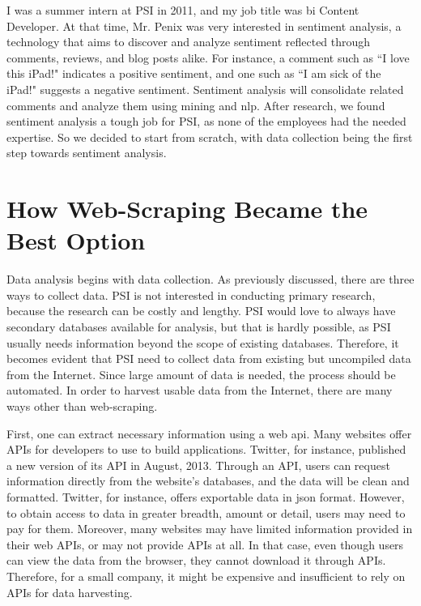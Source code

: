 \documentclass[12pt]{report}
\begin{document}
I was a summer intern at PSI in 2011, and my job title was \gls{bi} Content Developer. At that time, Mr. Penix was very interested in sentiment analysis, a technology that aims to discover and analyze sentiment reflected through comments, reviews, and blog posts alike. For instance, a comment such as ``I love this iPad!" indicates a positive sentiment, and one such as ``I am sick of the iPad!" suggests a negative sentiment. Sentiment analysis will consolidate related comments and analyze them using \gls{mining} and \gls{nlp}. After research, we found sentiment analysis a tough job for PSI, as none of the employees had the needed expertise. So we decided to start from scratch, with data collection being the first step towards sentiment analysis.

\section{How Web-Scraping Became the Best Option}

Data analysis begins with data collection. As previously discussed, there are three ways to collect data. PSI is not interested in conducting primary research, because the research can be costly and lengthy. PSI would love to always have secondary databases available for analysis, but that is hardly possible, as PSI usually needs information beyond the scope of existing databases. Therefore, it becomes evident that PSI need to collect data from existing but uncompiled data from the Internet. Since large amount of data is needed, the process should be automated. In order to \gls{harvest} usable data from the Internet, there are many ways other than web-scraping.

First, one can extract necessary information using a web \gls{api}. Many websites offer APIs for developers to use to build applications. Twitter, for instance, published a new version of its API in August, 2013. Through an API, users can request information directly from the website's databases, and the data will be clean and formatted. Twitter, for instance, offers exportable data in \gls{json} format. However, to obtain access to data in greater breadth, amount or detail, users may need to pay for them. Moreover, many websites may have limited information provided in their web APIs, or may not provide APIs at all. In that case, even though users can view the data from the browser, they cannot download it through APIs. Therefore, for a small company, it might be expensive and insufficient to rely on APIs for data harvesting.
\end{document}
